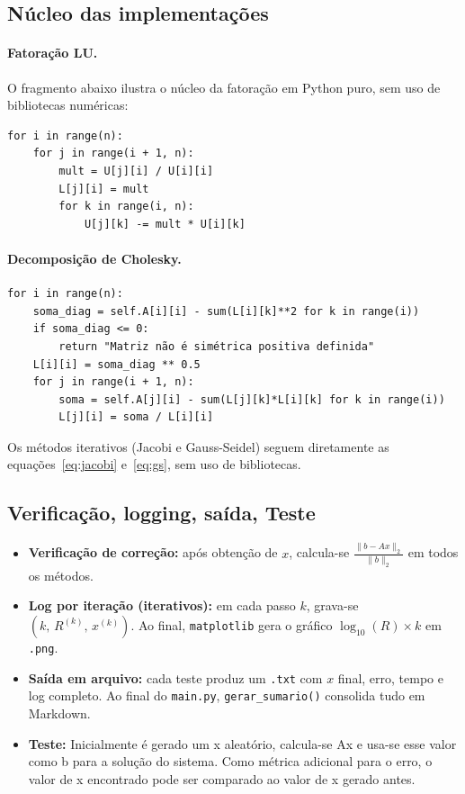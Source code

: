 \documentclass[12pt, a4paper]{article}
\begin{document}
\subsection{Núcleo das implementações}
 
\paragraph{Fatoração LU.}
O fragmento abaixo ilustra o núcleo da fatoração em Python puro, sem uso de
bibliotecas numéricas:
 
\begin{lstlisting}[caption={Núcleo da Fatoração LU (Python puro).}]
for i in range(n):
    for j in range(i + 1, n):
        mult = U[j][i] / U[i][i]
        L[j][i] = mult
        for k in range(i, n):
            U[j][k] -= mult * U[i][k]
\end{lstlisting}
 
\paragraph{Decomposição de Cholesky.}
 
\begin{lstlisting}[caption={Núcleo da Decomposição de Cholesky (Python puro).}]
for i in range(n):
    soma_diag = self.A[i][i] - sum(L[i][k]**2 for k in range(i))
    if soma_diag <= 0:
        return "Matriz não é simétrica positiva definida"
    L[i][i] = soma_diag ** 0.5
    for j in range(i + 1, n):
        soma = self.A[j][i] - sum(L[j][k]*L[i][k] for k in range(i))
        L[j][i] = soma / L[i][i]
\end{lstlisting}
 
Os métodos iterativos (Jacobi e Gauss-Seidel) seguem diretamente as
equações~\eqref{eq:jacobi} e~\eqref{eq:gs}, sem uso de bibliotecas.
 
\subsection{Verificação, logging, saída, Teste}
 
\begin{itemize}
  \item \textbf{Verificação de correção:} após obtenção de $x$, calcula-se
    $\frac{\|b - Ax\|_2}{\|b\|_2}$ em todos os métodos.
  \item \textbf{Log por iteração (iterativos):} em cada passo $k$, grava-se
    $(k,\, R^{(k)},\, x^{(k)})$. Ao final, \texttt{matplotlib} gera o gráfico
    $\log_{10}(R) \times k$ em \texttt{.png}.
  \item \textbf{Saída em arquivo:} cada teste produz um \texttt{.txt} com $x$ final,
    erro, tempo e log completo. Ao final do \texttt{main.py}, \texttt{gerar\_sumario()}
    consolida tudo em Markdown.
   \item \textbf{Teste:} Inicialmente é gerado um x    aleatório, calcula-se Ax e usa-se esse valor como b para a solução do sistema. Como métrica adicional para o erro, o valor de x encontrado pode ser comparado ao valor de x gerado antes.
\end{itemize}
 
\end{document}
